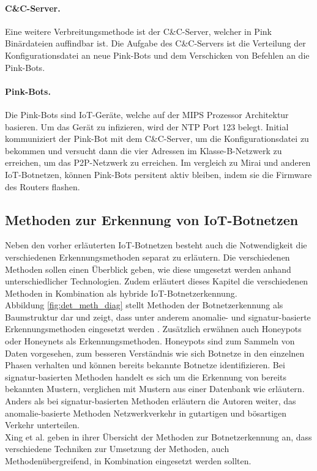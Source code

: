 \paragraph{C\&C-Server.} Eine weitere Verbreitungsmethode ist der C\&C-Server, welcher in Pink Binärdateien auffindbar ist. Die Aufgabe des C\&C-Servers ist die Verteilung der Konfigurationsdatei an neue Pink-Bots und dem Verschicken von Befehlen an die Pink-Bots. 
\paragraph{Pink-Bots.} Die Pink-Bots sind IoT-Geräte, welche auf der MIPS Prozessor Architektur \cite{Novkovic_Lukac_Jovanovic_Kastelan_2020} basieren. Um das Gerät zu infizieren, wird der NTP Port 123 belegt. Initial kommuniziert der Pink-Bot mit dem C\&C-Server, um die Konfigurationsdatei zu bekommen und versucht dann die vier Adressen im Klasse-B-Netzwerk zu erreichen, um das P2P-Netzwerk zu erreichen. Im vergleich zu Mirai und anderen IoT-Botnetzen, können Pink-Bots persitent aktiv bleiben, indem sie die Firmware des Routers flashen.

\newpage

\subsection{Methoden zur Erkennung von IoT-Botnetzen}

Neben den vorher erläuterten IoT-Botnetzen besteht auch die Notwendigkeit die verschiedenen Erkennungsmethoden separat zu erläutern. Die verschiedenen Methoden sollen einen Überblick geben, wie diese umgesetzt werden anhand unterschiedlicher Technologien. Zudem erläutert dieses Kapitel die verschiedenen Methoden in Kombination als hybride IoT-Botnetzerkennung.  \\[0.2in]

Abbildung \ref{fig:det_meth_diag} stellt Methoden der Botnetzerkennung als Baumstruktur dar und zeigt, dass unter anderem anomalie- und signatur-basierte Erkennungsmethoden eingesetzt werden \cite{Xing2021SurveyOB, jcp2010006, DBLP:journals/scn/GarciaZC14, DBLP:journals/corr/abs-2207-12937}. Zusätzlich erwähnen \cite{Xing2021SurveyOB,barazi_2014} auch Honeypots oder Honeynets als Erkennungsmethoden. Honeypots sind zum Sammeln von Daten vorgesehen, zum besseren Verständnis wie sich Botnetze in den einzelnen Phasen verhalten \cite{DBLP:journals/corr/abs-2108-02287} und können bereits bekannte Botnetze identifizieren. Bei signatur-basierten Methoden handelt es sich um die Erkennung von bereits bekannten Mustern, verglichen mit Mustern aus einer Datenbank wie \cite{Apostol_2021} erläutern. Anders als bei signatur-basierten Methoden erläutern die Autoren weiter, das anomalie-basierte Methoden Netzwerkverkehr in gutartigen und bösartigen Verkehr unterteilen. \\ Xing et al. \cite{Xing2021SurveyOB} geben in ihrer Übersicht der Methoden zur Botnetzerkennung an, dass verschiedene Techniken zur Umsetzung der Methoden, auch Methodenübergreifend, in Kombination eingesetzt werden sollten. 

